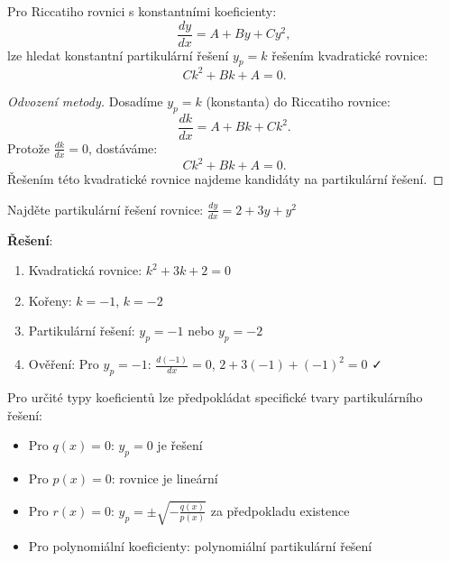 \vspace{0.8\baselineskip}

\begin{method}
\label{met:uhodnuti-konstantni}
Pro Riccatiho rovnici s konstantními koeficienty:
\[
\frac{dy}{dx} = A + By + Cy^2,
\]
lze hledat konstantní partikulární řešení $y_p = k$ řešením kvadratické rovnice:
\[
Ck^2 + Bk + A = 0.
\]
\end{method}

\vspace{0.6\baselineskip}

\begin{proof}[Odvození metody]
Dosadíme $y_p = k$ (konstanta) do Riccatiho rovnice:
\[
\frac{dk}{dx} = A + Bk + Ck^2.
\]
Protože $\frac{dk}{dx} = 0$, dostáváme:
\[
Ck^2 + Bk + A = 0.
\]
Řešením této kvadratické rovnice najdeme kandidáty na partikulární řešení.
\end{proof}

\vspace{0.6\baselineskip}

\begin{example}
\label{ex:metoda-uhodnuti}
Najděte partikulární řešení rovnice: $\frac{dy}{dx} = 2 + 3y + y^2$

\textbf{Řešení}:
\begin{enumerate}
\item Kvadratická rovnice: $k^2 + 3k + 2 = 0$
\item Kořeny: $k = -1$, $k = -2$
\item Partikulární řešení: $y_p = -1$ nebo $y_p = -2$
\item Ověření: Pro $y_p = -1$: $\frac{d(-1)}{dx} = 0$, $2 + 3(-1) + (-1)^2 = 0$ ✓
\end{enumerate}
\end{example}

\vspace{0.8\baselineskip}

\begin{method}
\label{met:specialni-tvary}
Pro určité typy koeficientů lze předpokládat specifické tvary partikulárního řešení:

\begin{itemize}
\item Pro $q(x) = 0$: $y_p = 0$ je řešení
\item Pro $p(x) = 0$: rovnice je lineární
\item Pro $r(x) = 0$: $y_p = \pm\sqrt{-\frac{q(x)}{p(x)}}$ za předpokladu existence
\item Pro polynomiální koeficienty: polynomiální partikulární řešení
\end{itemize}
\end{method}

